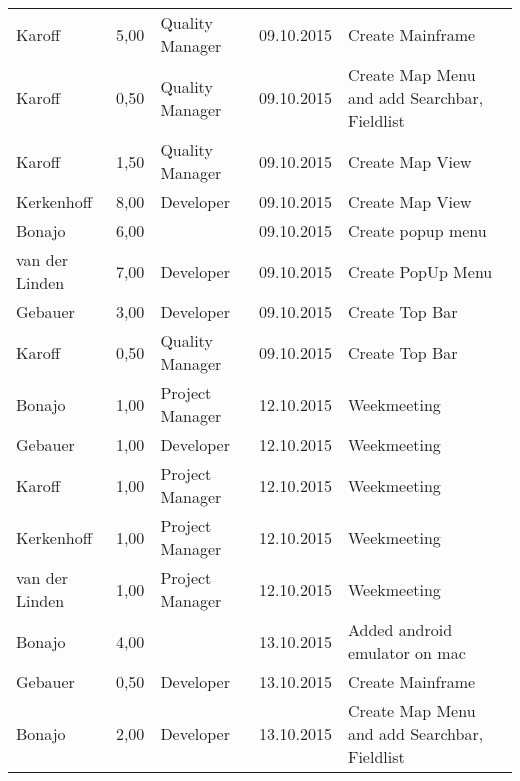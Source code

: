 \begin{longtable}{ l r p{2cm} c p{4cm} }
		Karoff                  & 5,00           & Quality Manager & 09.10.2015    & Create Mainframe                             \\
		Karoff                  & 0,50           & Quality Manager & 09.10.2015    & Create Map Menu and add Searchbar, Fieldlist \\
		Karoff                  & 1,50           & Quality Manager & 09.10.2015    & Create Map View                              \\
		Kerkenhoff              & 8,00           & Developer       & 09.10.2015    & Create Map View                              \\
		Bonajo                  & 6,00           &                 & 09.10.2015    & Create popup menu                            \\
		van der Linden          & 7,00           & Developer       & 09.10.2015    & Create PopUp Menu                            \\
		Gebauer                 & 3,00           & Developer       & 09.10.2015    & Create Top Bar                               \\
		Karoff                  & 0,50           & Quality Manager & 09.10.2015    & Create Top Bar                               \\
		Bonajo                  & 1,00           & Project Manager & 12.10.2015    & Weekmeeting                                  \\
		Gebauer                 & 1,00           & Developer       & 12.10.2015    & Weekmeeting                                  \\
		Karoff                  & 1,00           & Project Manager & 12.10.2015    & Weekmeeting                                  \\
		Kerkenhoff              & 1,00           & Project Manager & 12.10.2015    & Weekmeeting                                  \\
		van der Linden          & 1,00           & Project Manager & 12.10.2015    & Weekmeeting                                  \\
		Bonajo                  & 4,00           &                 & 13.10.2015    & Added android emulator on mac                \\
		Gebauer                 & 0,50           & Developer       & 13.10.2015    & Create Mainframe                             \\
		Bonajo                  & 2,00           & Developer       & 13.10.2015    & Create Map Menu and add Searchbar, Fieldlist \\

\end{longtable}
